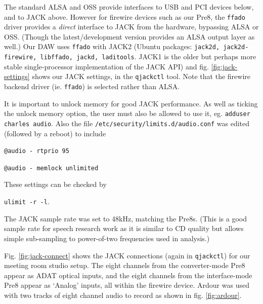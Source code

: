 \documentclass[oneside,english]{scrbook}
\begin{document}
The standard ALSA and OSS provide interfaces to USB and PCI devices below, and to JACK above.  However for firewire devices such as our Pre8, the {\tt ffado} driver  provides a {\em direct} interface to JACK from the hardware, bypassing ALSA or OSS.  (Though the latest/development version provides an ALSA output layer as well.)   Our DAW uses {\tt ffado} with JACK2 (Ubuntu packages: {\tt jack2d, jack2d-firewire, libffado, jackd, laditools}.  JACK1 is the older but perhaps more stable single-processor implementation of the JACK API) and fig. \ref{fig:jack-settings} shows our JACK settings, in the {\tt qjackctl} tool.  Note that the firewire backend driver (ie. {\tt ffado}) is selected rather than ALSA.

It is important to unlock memory for good JACK performance.  As well as ticking the unlock memory option, the user must also be allowed to use it, eg. {\tt adduser charles audio}.  Also the file {\tt /etc/security/limits.d/audio.conf} was edited (followed by a reboot) to include

{\tt @audio - rtprio 95 }

{\tt @audio - memlock unlimited }

These settings can be checked by

{\tt ulimit -r -l}.

The JACK sample rate was set to 48kHz, matching the Pre8s.  (This is a good sample rate for speech research work as it is similar to CD quality but allows simple sub-sampling to power-of-two frequencies used in analysis.)

Fig. \ref{fig:jack-connect} shows the JACK connections (again in {\tt qjackctl}) for our meeting room studio setup.  The eight channels from the converter-mode Pre8 appear as ADAT optical inputs, and the eight channels from the interface-mode Pre8 appear as `Analog' inputs, all within the firewire device.  Ardour was used with two tracks of eight channel audio to record as shown in fig. \ref{fig:ardour}.
\end{document}
